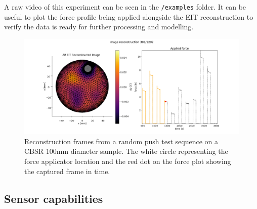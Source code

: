 A raw video of this experiment can be seen in the \verb|/examples| folder. It can be useful to plot the force profile being applied alongside the EIT reconstruction to verify the data is ready for further processing and modelling. 
\begin{figure}[H]
\centering
\includegraphics[width=\linewidth]{Figures/CBSR_8p_OG_10push_RAND1_strain_120s_1mA_2_frame381.png}
\caption{Reconstruction frames from a random push test sequence on a CBSR 100mm diameter sample. The white circle representing the force applicator location and the red dot on the force plot showing the captured frame in time.}
\label{fig:rand_recon_and force_result}
\end{figure}


\subsection{Sensor capabilities}

